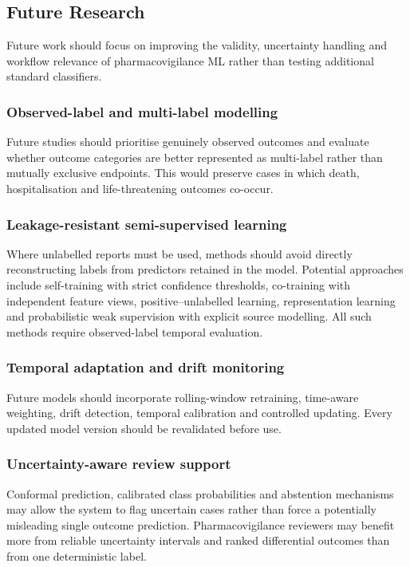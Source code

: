 \documentclass[10pt]{article}
\begin{document}
\subsection{Future Research}
Future work should focus on improving the validity, uncertainty handling and workflow relevance of pharmacovigilance ML rather than testing additional standard classifiers.

\subsubsection{Observed-label and multi-label modelling}
Future studies should prioritise genuinely observed outcomes and evaluate whether outcome categories are better represented as multi-label rather than mutually exclusive endpoints. This would preserve cases in which death, hospitalisation and life-threatening outcomes co-occur.

\subsubsection{Leakage-resistant semi-supervised learning}
Where unlabelled reports must be used, methods should avoid directly reconstructing labels from predictors retained in the model. Potential approaches include self-training with strict confidence thresholds, co-training with independent feature views, positive--unlabelled learning, representation learning and probabilistic weak supervision with explicit source modelling. All such methods require observed-label temporal evaluation.

\subsubsection{Temporal adaptation and drift monitoring}
Future models should incorporate rolling-window retraining, time-aware weighting, drift detection, temporal calibration and controlled updating. Every updated model version should be revalidated before use.

\subsubsection{Uncertainty-aware review support}
Conformal prediction, calibrated class probabilities and abstention mechanisms may allow the system to flag uncertain cases rather than force a potentially misleading single outcome prediction. Pharmacovigilance reviewers may benefit more from reliable uncertainty intervals and ranked differential outcomes than from one deterministic label.
\end{document}
